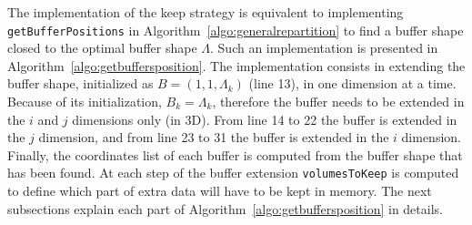 \documentclass[conference]{IEEEtran}
\begin{document}
The implementation of the keep strategy is equivalent to implementing
\texttt{getBufferPositions} in Algorithm~\ref{algo:generalrepartition} to find a
buffer shape closed to the optimal buffer shape $\Lambda$. Such an implementation is
presented in Algorithm~\ref{algo:getbuffersposition}. The implementation
consists in extending the buffer shape, initialized as $B=(1,1,\Lambda_k)$ (line 13), in
one dimension at a time. Because of its initialization, $B_k=\Lambda_k$, therefore
the buffer needs to be extended in the $i$ and $j$ dimensions only (in 3D).
From line 14 to 22 the buffer is extended in the $j$
dimension, and from line 23 to 31 the buffer is extended in the $i$ dimension.
Finally, the coordinates list of each buffer is computed from the buffer shape
that has been found. At each step of the buffer extension \texttt{volumesToKeep}
is computed to define which part of extra data will have to be kept in memory.
The next subsections explain each part of Algorithm~\ref{algo:getbuffersposition}
in details.
\end{document}
